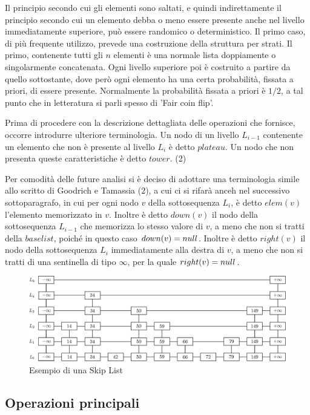 	Il principio secondo cui gli elementi sono saltati, e quindi indirettamente il principio secondo cui un elemento debba o meno essere presente anche nel livello immediatamente superiore, può essere randomico o deterministico. Il primo caso, di più frequente utilizzo, prevede una costruzione della struttura per strati. Il primo, contenente tutti gli $ n $ elementi è una normale lista doppiamente o singolarmente concatenata. Ogni livello superiore poi è costruito a partire da quello sottostante, dove però ogni elemento ha una certa probabilità, fissata a priori, di essere presente. Normalmente la probabilità fissata a priori è $ 1/2 $, a tal punto che in letteratura si parli spesso di 'Fair coin flip'.
	
	Prima di procedere con la descrizione dettagliata delle operazioni che fornisce, occorre introdurre ulteriore terminologia. Un nodo di un livello $ L_{i-1} $ contenente un elemento che non è presente al livello $ L_{i} $ è detto $ plateau $. Un nodo che non presenta queste caratteristiche è detto $ tower $. (2)
	
	Per comodità delle future analisi si è deciso di adottare una terminologia simile allo scritto di Goodrich e Tamassia (2), a cui ci si rifarà anceh nel successivo sottoparagrafo, in cui per ogni nodo $ v $ della sottosequenza $ L_{i} $, è detto $ elem(v) $ l'elemento memorizzato in $ v $. Inoltre è detto $ down(v) $ il nodo della sottosequenza $ L_{i-1} $ che memorizza lo stesso valore di $ v $, a meno che non si tratti della $base list$, poiché in questo caso $down(v) = \boldmath{null}$.
	Inoltre è detto $right(v)$ il nodo della sottosequenza $ L_{i} $ immediatamente alla destra di $v$, a meno che non si tratti di una sentinella di tipo $\infty$, per la quale $right(v) = \boldmath{null}$.
		
	\begin{figure}
		\centering
		\includegraphics[scale=0.6]{figure/skiplist.eps}
		\caption{Esempio di una Skip List}\label{fig:1}
	\end{figure}
		
	\subsection{Operazioni principali}
	
